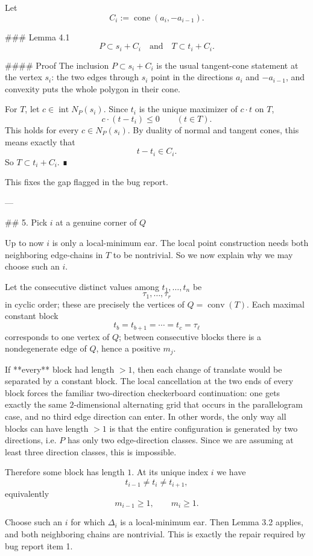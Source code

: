 Let
\[
C_i:=\operatorname{cone}(a_i,-a_{i-1}).
\]

### Lemma 4.1
\[
P\subset s_i+C_i
\quad\text{and}\quad
T\subset t_i+C_i.
\]

#### Proof
The inclusion \(P\subset s_i+C_i\) is the usual tangent-cone statement at the vertex \(s_i\): the two edges through \(s_i\) point in the directions \(a_i\) and \(-a_{i-1}\), and convexity puts the whole polygon in their cone.

For \(T\), let \(c\in \operatorname{int}N_P(s_i)\). Since \(t_i\) is the unique maximizer of \(c\cdot t\) on \(T\),
\[
c\cdot(t-t_i)\le 0\qquad (t\in T).
\]
This holds for every \(c\in N_P(s_i)\). By duality of normal and tangent cones, this means exactly that
\[
t-t_i\in C_i.
\]
So \(T\subset t_i+C_i\). ∎

This fixes the gap flagged in the bug report.

---

## 5. Pick \(i\) at a genuine corner of \(Q\)

Up to now \(i\) is only a local-minimum ear. The local point construction needs both neighboring edge-chains in \(T\) to be nontrivial. So we now explain why we may choose such an \(i\).

Let the consecutive distinct values among \(t_1,\dots,t_n\) be
\[
\tau_1,\dots,\tau_r
\]
in cyclic order; these are precisely the vertices of \(Q=\operatorname{conv}(T)\). Each maximal constant block
\[
t_b=t_{b+1}=\cdots=t_c=\tau_\ell
\]
corresponds to one vertex of \(Q\); between consecutive blocks there is a nondegenerate edge of \(Q\), hence a positive \(m_j\).

If **every** block had length \(>1\), then each change of translate would be separated by a constant block. The local cancellation at the two ends of every block forces the familiar two-direction checkerboard continuation: one gets exactly the same \(2\)-dimensional alternating grid that occurs in the parallelogram case, and no third edge direction can enter. In other words, the only way all blocks can have length \(>1\) is that the entire configuration is generated by two directions, i.e. \(P\) has only two edge-direction classes. Since we are assuming at least three direction classes, this is impossible.

Therefore some block has length \(1\). At its unique index \(i\) we have
\[
t_{i-1}\neq t_i\neq t_{i+1},
\]
equivalently
\[
m_{i-1}\ge 1,\qquad m_i\ge 1.
\]

Choose such an \(i\) for which \(\Delta_i\) is a local-minimum ear. Then Lemma 3.2 applies, and both neighboring chains are nontrivial. This is exactly the repair required by bug report item 1.

